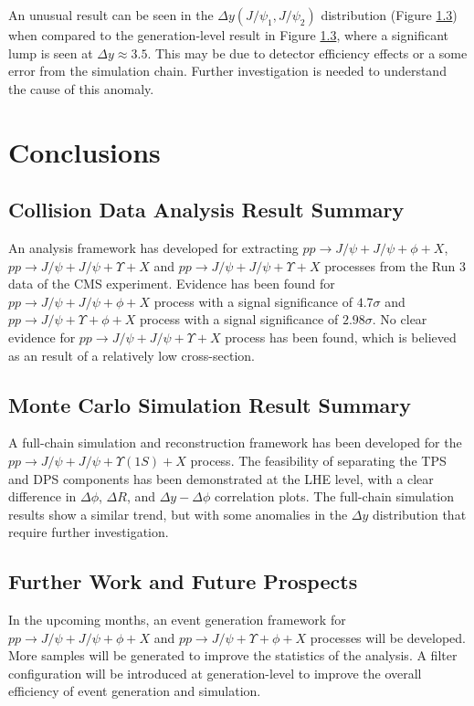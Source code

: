\documentclass[10pt,twocolumn]{article}
\begin{document}
An unusual result can be seen in the $\Delta y (J/\psi_1, J/\psi_2)$ distribution (Figure \ref{}) when compared to the generation-level result in Figure \ref{}, where a significant lump is seen at $\Delta y \approx 3.5$. This may be due to detector efficiency effects or a some error from the simulation chain. Further investigation is needed to understand the cause of this anomaly.

\section{Conclusions}

\subsection{Collision Data Analysis Result Summary}

An analysis framework has developed for extracting $pp \to J/\psi+J/\psi+\phi+X$, $pp \to J/\psi+J/\psi+\Upsilon+X$ and $pp \to J/\psi+J/\psi+\Upsilon+X$ processes from the Run 3 data of the CMS experiment. Evidence has been found for $pp \to J/\psi+J/\psi+\phi+X$ process with a signal significance of $4.7\sigma$ and $pp \to J/\psi+\Upsilon+\phi+X$ process with a signal significance of $2.98\sigma$. No clear evidence for $pp \to J/\psi+J/\psi+\Upsilon+X$ process has been found, which is believed as an result of a relatively low cross-section.

\subsection{Monte Carlo Simulation Result Summary}

A full-chain simulation and reconstruction framework has been developed for the $pp \to J/\psi+J/\psi+\Upsilon(1S)+X$ process. The feasibility of separating the TPS and DPS components has been demonstrated at the LHE level, with a clear difference in $\Delta \phi$, $\Delta R$, and $\Delta y - \Delta \phi$ correlation plots. The full-chain simulation results show a similar trend, but with some anomalies in the $\Delta y$ distribution that require further investigation.

\subsection{Further Work and Future Prospects}

In the upcoming months, an event generation framework for $pp\to J/\psi+J/\psi+\phi+X$ and $pp\to J/\psi+\Upsilon+\phi+X$ processes will be developed. More samples will be generated to improve the statistics of the analysis. A filter configuration will be introduced at generation-level to improve the overall efficiency of event generation and simulation.
\end{document}
